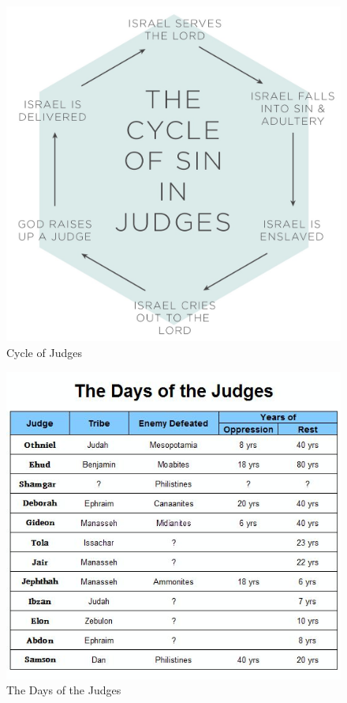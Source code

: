 \newpage
\begin{figure}
\begin{center}
\includegraphics[scale=0.3, angle=0]{07OT-Judges/References/5.Cycles-Judges}
\caption[Cycle of Judges]{Cycle of Judges}
\label{fig:Cycle of Judges}
\end{center}
\end{figure}


\newpage
\begin{figure}
\begin{center}
\includegraphics[scale=0.7, angle=0]{07OT-Judges/References/6.DaysOfJudges}
\caption[The Days of the Judges]{The Days of the Judges}
\label{fig:The Days of the Judges}
\end{center}
\end{figure}


